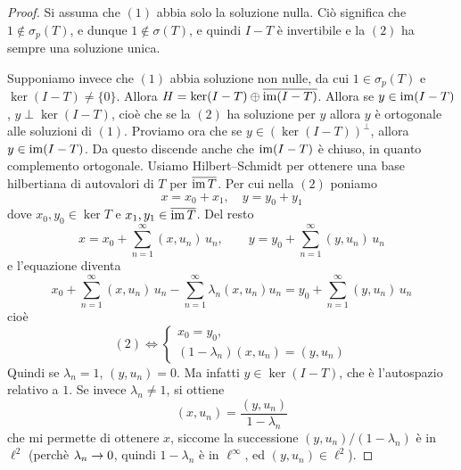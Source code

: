 \begin{proof}
	Si assuma che $(1)$ abbia solo la soluzione nulla. Ciò significa che $1 \notin \sigma_p(T)$, e dunque $1 \notin \sigma(T)$, e quindi $I-T$ è invertibile e la $(2)$ ha sempre una soluzione unica.

	Supponiamo invece che $(1)$ abbia soluzione non nulle, da cui $1 \in \sigma_p(T)$ e $\ker (I-T) \neq \{0\}$. Allora $H = \ker (I-T) \oplus \overline{\operatorname{im} (I-T)}$. Allora se $y \in \operatorname{im}(I-T)$, $y \perp \ker (I-T)$, cioè che se la $(2)$ ha soluzione per $y$ allora $y$ è ortogonale alle soluzioni di $(1)$.
	Proviamo ora che se $y \in (\ker(I-T))^\perp$, allora $y \in \operatorname{im}(I-T)$. Da questo discende anche che $\operatorname{im}(I-T)$ è chiuso, in quanto complemento ortogonale.
	Usiamo Hilbert--Schmidt per ottenere una base hilbertiana di autovalori di $T$ per $\overline{\operatorname{im} T}$. Per cui nella $(2)$ poniamo
	\begin{equation*}
		x = x_0 + x_1, \quad y=y_0+y_1
	\end{equation*}
	dove $x_0,y_0 \in \ker T$ e $x_1,y_1 \in \overline{\operatorname{im} T}$. Del resto
	\begin{equation*}
		x = x_0 + \sum_{n=1}^\infty (x, u_n)\,u_n, \qquad y = y_0 + \sum_{n=1}^\infty (y, u_n)\,u_n
	\end{equation*}
	e l'equazione diventa
	\begin{equation*}
		x_0 + \sum_{n=1}^\infty (x, u_n)\,u_n - \sum_{n=1}^\infty \lambda_n (x,u_n) u_n = y_0 + \sum_{n=1}^\infty (y, u_n)\,u_n
	\end{equation*}
	cioè
	\begin{equation*}
		(2) \iff
		\begin{cases}
			x_0 = y_0,\\
			(1-\lambda_n)(x,u_n) = (y,u_n)
		\end{cases}
	\end{equation*}
	Quindi se $\lambda_n =1$, $(y,u_n) = 0$. Ma infatti $y \in \ker(I-T)$, che è l'autospazio relativo a $1$.
	Se invece $\lambda_n \neq 1$, si ottiene
	\begin{equation*}
		(x,u_n) = \frac{(y,u_n)}{1-\lambda_n}
	\end{equation*}
	che mi permette di ottenere $x$, siccome la successione $(y,u_n)/(1-\lambda_n)$ è in $\ell^2$ (perchè $\lambda_n \underset{{}}{\rightarrow} 0$, quindi $1-\lambda_n$ è in $\ell^\infty$, ed $(y,u_n) \in \ell^2$).
\end{proof}
